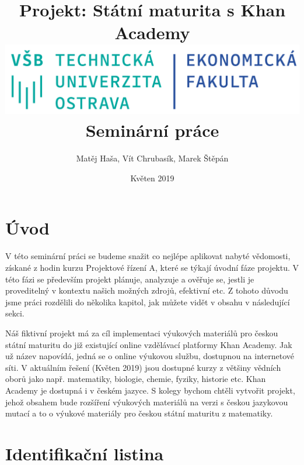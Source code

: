 \documentclass[12pt, a4paper]{report}
\author{Matěj Haša, Vít Chrubasík, Marek Štěpán}
\date{Květen 2019}
\title{Projekt: Státní maturita s Khan Academy\\\medskip
\large \includegraphics[width=\linewidth]{./images/skola_logo.png} Seminární práce}
\begin{document}
\maketitle
\tableofcontents
\thispagestyle{empty}



\chapter{Úvod}
\label{sec:org3f72f3c}
V této seminární práci se budeme snažit co nejlépe aplikovat nabyté vědomosti, získané z hodin kurzu Projektové řízení A, které se týkají úvodní fáze projektu. V této fázi se především projekt plánuje, analyzuje a ověřuje se, jestli je proveditelný v kontextu našich možných zdrojů, efektivní etc. Z tohoto důvodu jsme práci rozdělili do několika kapitol, jak můžete vidět v obsahu v následující sekci. 

Náš fiktivní projekt má za cíl implementaci výukových materiálů pro českou státní maturitu do již existující online vzdělávací platformy Khan Academy. Jak už název napovídá, jedná se o online výukovou službu, dostupnou na internetové síti. V aktuálním řešení (Květen 2019) jsou dostupné kurzy z většiny vědních oborů jako např. matematiky, biologie, chemie, fyziky, historie etc. Khan Academy je dostupná i v českém jazyce. S kolegy bychom chtěli vytvořit projekt, jehož obsahem bude rozšíření výukových materiálů na verzi s českou jazykovou mutací a to o výukové materiály pro českou státní maturitu z matematiky.
\chapter{Identifikační listina}
\label{sec:org8360286}
\end{document}
